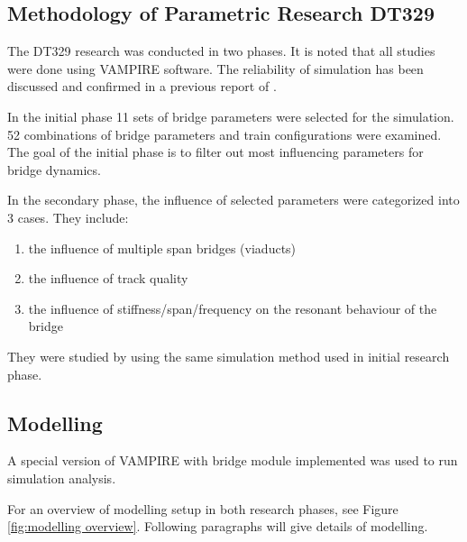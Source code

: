 \subsection{Methodology of Parametric Research DT329}

The DT329 research was conducted in two phases. It is noted that all studies were done using VAMPIRE software. The reliability of simulation has been discussed and confirmed in a previous report of \citet{d181rp2}.

In the initial phase 11 sets of bridge parameters were selected for the simulation. 52 combinations of bridge parameters and train configurations were examined. The goal of the initial phase is to filter out most influencing parameters for bridge dynamics.

In the secondary phase, the influence of selected parameters were categorized into 3 cases. They include:
\begin{enumerate}
 \item the influence of multiple span bridges (viaducts)
 \item the influence of track quality
 \item the influence of stiffness/span/frequency on the resonant behaviour of the bridge
\end{enumerate}
They were studied by using the same simulation method used in initial research phase.


\subsection{Modelling}\label{sec:modelling329}
A special version of VAMPIRE with bridge module implemented was used to run simulation analysis. 

For an overview of modelling setup in both research phases, see Figure \ref{fig:modelling overview}. Following paragraphs will give details of modelling.


